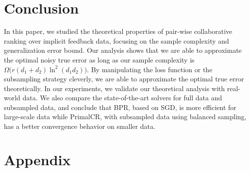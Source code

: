 \documentclass[conference]{IEEEtran}
\numberwithin{equation}{section}
\newtheorem{sampling strategy}{Sampling Strategy}
\begin{document}
\section{Conclusion}
\label{sec:conclusion}

In this paper, we studied the theoretical properties of pair-wise collaborative ranking  over implicit feedback data, focusing on the sample complexity and generalization error bound. Our analysis shows that we are able to approximate the optimal noisy true error as long as our sample complexity is $\Omega \big( r(d_1+d_2)\ln^2(d_1d_2) \big)$. By manipulating the loss function or the subsampling strategy cleverly, we are able to approximate the optimal true error theoretically. 
In our experiments, we validate our theoretical analysis with real-world data. We also compare the state-of-the-art solvers for full data and subsampled data, and conclude that \textsf{BPR}, based on SGD, is more efficient for large-scale data while \textsf{PrimalCR}, with subsampled data using balanced sampling,  has a better convergence behavior on smaller data.  










\section{Appendix}
\end{document}
